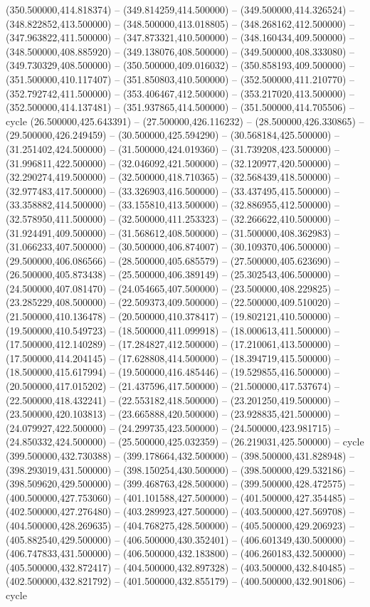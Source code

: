    (350.500000,414.818374) -- (349.814259,414.500000) -- (349.500000,414.326524) -- (348.822852,413.500000) -- (348.500000,413.018805) -- (348.268162,412.500000) -- (347.963822,411.500000) -- (347.873321,410.500000) -- (348.160434,409.500000) -- (348.500000,408.885920) -- (349.138076,408.500000) -- (349.500000,408.333080) -- (349.730329,408.500000) -- (350.500000,409.016032) -- (350.858193,409.500000) -- (351.500000,410.117407) -- (351.850803,410.500000) -- (352.500000,411.210770) -- (352.792742,411.500000) -- (353.406467,412.500000) -- (353.217020,413.500000) -- (352.500000,414.137481) -- (351.937865,414.500000) -- (351.500000,414.705506) -- cycle
   (26.500000,425.643391) -- (27.500000,426.116232) -- (28.500000,426.330865) -- (29.500000,426.249459) -- (30.500000,425.594290) -- (30.568184,425.500000) -- (31.251402,424.500000) -- (31.500000,424.019360) -- (31.739208,423.500000) -- (31.996811,422.500000) -- (32.046092,421.500000) -- (32.120977,420.500000) -- (32.290274,419.500000) -- (32.500000,418.710365) -- (32.568439,418.500000) -- (32.977483,417.500000) -- (33.326903,416.500000) -- (33.437495,415.500000) -- (33.358882,414.500000) -- (33.155810,413.500000) -- (32.886955,412.500000) -- (32.578950,411.500000) -- (32.500000,411.253323) -- (32.266622,410.500000) -- (31.924491,409.500000) -- (31.568612,408.500000) -- (31.500000,408.362983) -- (31.066233,407.500000) -- (30.500000,406.874007) -- (30.109370,406.500000) -- (29.500000,406.086566) -- (28.500000,405.685579) -- (27.500000,405.623690) -- (26.500000,405.873438) -- (25.500000,406.389149) -- (25.302543,406.500000) -- (24.500000,407.081470) -- (24.054665,407.500000) -- (23.500000,408.229825) -- (23.285229,408.500000) -- (22.509373,409.500000) -- (22.500000,409.510020) -- (21.500000,410.136478) -- (20.500000,410.378417) -- (19.802121,410.500000) -- (19.500000,410.549723) -- (18.500000,411.099918) -- (18.000613,411.500000) -- (17.500000,412.140289) -- (17.284827,412.500000) -- (17.210061,413.500000) -- (17.500000,414.204145) -- (17.628808,414.500000) -- (18.394719,415.500000) -- (18.500000,415.617994) -- (19.500000,416.485446) -- (19.529855,416.500000) -- (20.500000,417.015202) -- (21.437596,417.500000) -- (21.500000,417.537674) -- (22.500000,418.432241) -- (22.553182,418.500000) -- (23.201250,419.500000) -- (23.500000,420.103813) -- (23.665888,420.500000) -- (23.928835,421.500000) -- (24.079927,422.500000) -- (24.299735,423.500000) -- (24.500000,423.981715) -- (24.850332,424.500000) -- (25.500000,425.032359) -- (26.219031,425.500000) -- cycle
   (399.500000,432.730388) -- (399.178664,432.500000) -- (398.500000,431.828948) -- (398.293019,431.500000) -- (398.150254,430.500000) -- (398.500000,429.532186) -- (398.509620,429.500000) -- (399.468763,428.500000) -- (399.500000,428.472575) -- (400.500000,427.753060) -- (401.101588,427.500000) -- (401.500000,427.354485) -- (402.500000,427.276480) -- (403.289923,427.500000) -- (403.500000,427.569708) -- (404.500000,428.269635) -- (404.768275,428.500000) -- (405.500000,429.206923) -- (405.882540,429.500000) -- (406.500000,430.352401) -- (406.601349,430.500000) -- (406.747833,431.500000) -- (406.500000,432.183800) -- (406.260183,432.500000) -- (405.500000,432.872417) -- (404.500000,432.897328) -- (403.500000,432.840485) -- (402.500000,432.821792) -- (401.500000,432.855179) -- (400.500000,432.901806) -- cycle
